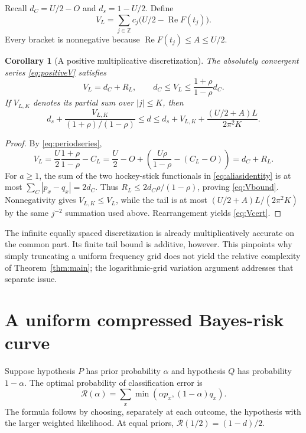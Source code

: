\documentclass[11pt]{article}
\newtheorem{corollary}[theorem]{Corollary}
\theoremstyle{definition}
\theoremstyle{remark}
\DeclareMathOperator{\Rea}{Re}
\newcommand{\Z}{\mathbb Z}
\newcommand{\cR}{\mathcal R}
\begin{document}
Recall $d_C=U/2-O$ and $d_s=1-U/2$. Define
\begin{equation}
 V_L=\sum_{j\in\Z}c_j\bigl(U/2-\Rea F(t_j)\bigr).
 \label{eq:positiveV}
\end{equation}
Every bracket is nonnegative because $\Rea F(t_j)\le A\le U/2$.

\begin{corollary}[A positive multiplicative discretization]
\label{cor:positive}
The absolutely convergent series \eqref{eq:positiveV} satisfies
\begin{equation}
 V_L=d_C+R_L,
 \qquad d_C\le V_L\le\frac{1+\rho}{1-\rho}d_C.
 \label{eq:Vbound}
\end{equation}
If $V_{L,K}$ denotes its partial sum over $|j|\le K$, then
\begin{equation}
 d_s+\frac{V_{L,K}}{(1+\rho)/(1-\rho)}
 \le d\le d_s+V_{L,K}+\frac{(U/2+A)L}{2\pi^2K}.
 \label{eq:Vcert}
\end{equation}
\end{corollary}
\begin{proof}
By \eqref{eq:periodseries},
\[
 V_L=\frac U2\frac{1+\rho}{1-\rho}-C_L
     =\frac U2-O+\left(\frac{U\rho}{1-\rho}-(C_L-O)\right)
     =d_C+R_L.
\]
For $a\ge1$, the sum of the two hockey-stick functionals in \eqref{eq:aliasidentity} is at most $\sum_C|p_x-q_x|=2d_C$. Thus $R_L\le2d_C\rho/(1-\rho)$, proving \eqref{eq:Vbound}. Nonnegativity gives $V_{L,K}\le V_L$, while the tail is at most $(U/2+A)L/(2\pi^2K)$ by the same $j^{-2}$ summation used above. Rearrangement yields \eqref{eq:Vcert}.
\end{proof}

The infinite equally spaced discretization is already multiplicatively accurate on the common part. Its finite tail bound is additive, however. This pinpoints why simply truncating a uniform frequency grid does not yield the relative complexity of Theorem~\ref{thm:main}; the logarithmic-grid variation argument addresses that separate issue.

\section{A uniform compressed Bayes-risk curve}
\label{sec:bayes}

Suppose hypothesis $P$ has prior probability $\alpha$ and hypothesis $Q$ has probability $1-\alpha$. The optimal probability of classification error is
\begin{equation}
 \cR(\alpha)=\sum_x\min(\alpha p_x,(1-\alpha)q_x).
 \label{eq:risk}
\end{equation}
The formula follows by choosing, separately at each outcome, the hypothesis with the larger weighted likelihood. At equal priors, $\cR(1/2)=(1-d)/2$.
\end{document}
